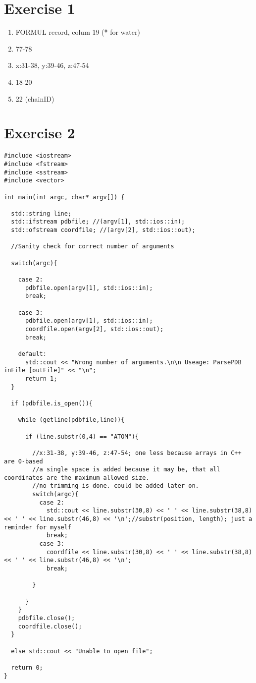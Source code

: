 \documentclass[11pt]{article}
\begin{document}
\date{\today}

\section{Exercise 1}

\begin{enumerate}
 \item FORMUL record, colum 19 (* for water)
 \item 77-78
 \item x:31-38, y:39-46, z:47-54
 \item 18-20
 \item 22 (chainID)
\end{enumerate}

\section{Exercise 2}

\begin{lstlisting}
#include <iostream>
#include <fstream>
#include <sstream>
#include <vector>

int main(int argc, char* argv[]) {

  std::string line;
  std::ifstream pdbfile; //(argv[1], std::ios::in);
  std::ofstream coordfile; //(argv[2], std::ios::out);

  //Sanity check for correct number of arguments

  switch(argc){

    case 2:
      pdbfile.open(argv[1], std::ios::in);
      break;

    case 3:
      pdbfile.open(argv[1], std::ios::in);
      coordfile.open(argv[2], std::ios::out);
      break;

    default:
      std::cout << "Wrong number of arguments.\n\n Useage: ParsePDB inFile [outFile]" << "\n";
      return 1;
  }
    
  if (pdbfile.is_open()){ 
  
    while (getline(pdbfile,line)){
    
      if (line.substr(0,4) == "ATOM"){

        //x:31-38, y:39-46, z:47-54; one less because arrays in C++ are 0-based
        //a single space is added because it may be, that all coordinates are the maximum allowed size.
        //no trimming is done. could be added later on.
        switch(argc){
          case 2:
            std::cout << line.substr(30,8) << ' ' << line.substr(38,8) << ' ' << line.substr(46,8) << '\n';//substr(position, length); just a reminder for myself
            break;
          case 3:
            coordfile << line.substr(30,8) << ' ' << line.substr(38,8) << ' ' << line.substr(46,8) << '\n';
            break;

        }
	
      }
    }
    pdbfile.close();
    coordfile.close();
  }

  else std::cout << "Unable to open file"; 

  return 0;
}

\end{lstlisting}
\end{document}
